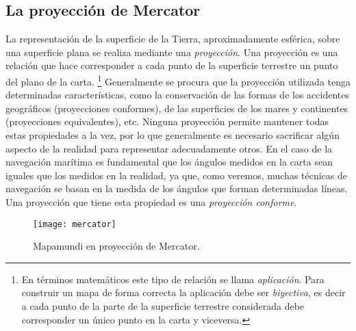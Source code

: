 

\subsection{La proyección de Mercator}




La representación de la superficie de la Tierra, aproximadamente esférica, sobre una superficie plana se realiza mediante una \emph{proyección}. Una proyección es una relación que hace 
corresponder a cada punto de la superficie terrestre un punto del plano de la carta.%
\footnote{En términos matemáticos este tipo de relación se llama \emph{aplicación}. Para construir un mapa de 
forma correcta la aplicación debe ser \emph{biyectiva}, es decir a cada punto de la parte de la superficie terrestre considerada debe corresponder un único punto en la carta y viceversa.}
 Generalmente se procura que la proyección utilizada tenga determinadas características, como la 
conservación de las formas de los accidentes geográficos (proyecciones conformes), de las superficies de los mares y continentes (proyecciones equivalentes), etc. Ninguna proyección 
permite mantener todas estas propiedades a la vez, por lo que generalmente es necesario 
sacrificar algún aspecto de la realidad para representar adecuadamente otros. En el caso 
de la navegación marítima es fundamental que los ángulos medidos en la carta sean iguales que los medidos en la realidad, ya que, como veremos, muchas técnicas de navegación 
se basan en la medida de los ángulos que forman determinadas líneas. 
Una proyección que tiene esta propiedad es una \emph{proyección conforme}. 

\begin{figure}[hbtp]
\begin{center}
\texttt{[image: mercator]}\\
\caption{Mapamundi en proyección de Mercator.}
\label{fg:mercator}
\end{center}
\end{figure}

